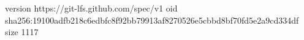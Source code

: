 version https://git-lfs.github.com/spec/v1
oid sha256:19100adfb218c6edbfc8f92bb79913af8270526e5cbbd8bf70fd5e2a9cd334df
size 1117
